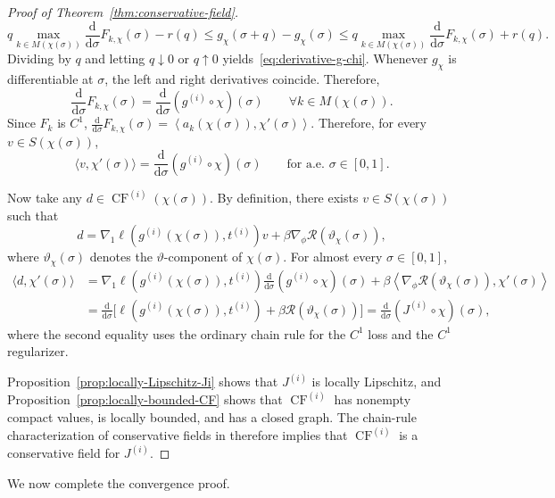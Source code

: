 \documentclass[11pt, letterpaper, oneside, reqno]{amsart}
\newcommand{\dd}{\mathrm{d}}
\begin{document}
\begin{proof}[Proof of Theorem~\ref{thm:conservative-field}]
\[
q\max_{k\in M(\chi(\sigma))}\frac{\dd}{\dd\sigma}F_{k,\chi}(\sigma)-r(q)
\le g_\chi(\sigma+q)-g_\chi(\sigma)
\le q\max_{k\in M(\chi(\sigma))}\frac{\dd}{\dd\sigma}F_{k,\chi}(\sigma)+r(q).
\]
Dividing by $q$ and letting $q\downarrow0$ or $q\uparrow0$ yields~\eqref{eq:derivative-g-chi}. Whenever $g_\chi$ is differentiable at $\sigma$, the left and right derivatives coincide. Therefore,
\[
\frac{\dd}{\dd\sigma}F_{k,\chi}(\sigma)
= \frac{\dd}{\dd\sigma}(g^{(i)}\circ\chi)(\sigma)
\qquad \forall k\in M(\chi(\sigma)).
\]
Since $F_k$ is $C^1$, $\frac{\dd}{\dd\sigma}F_{k,\chi}(\sigma) = \left\langle a_k(\chi(\sigma)),\chi'(\sigma)\right\rangle$.
Therefore, for every $v\in S(\chi(\sigma))$,
\[
\langle v,\chi'(\sigma)\rangle
= \frac{\dd}{\dd\sigma}(g^{(i)}\circ\chi)(\sigma) \qquad\text{for a.e. }\sigma\in[0,1].
\]

Now take any $d\in\operatorname{CF}^{(i)}(\chi(\sigma))$. By definition, there exists $v\in S(\chi(\sigma))$ such that
\[
d = \nabla_1\ell(g^{(i)}(\chi(\sigma)),t^{(i)})v + \beta\nabla_\phi\mathcal R(\vartheta_\chi(\sigma)),
\]
where $\vartheta_\chi(\sigma)$ denotes the $\vartheta$-component of $\chi(\sigma)$. For almost every $\sigma\in[0,1]$,
\begin{align*}
\langle d,\chi'(\sigma)\rangle
&= \nabla_1\ell(g^{(i)}(\chi(\sigma)),t^{(i)}) \frac{\dd}{\dd\sigma}(g^{(i)}\circ\chi)(\sigma)
+ \beta \left\langle \nabla_\phi\mathcal R(\vartheta_\chi(\sigma)),\chi'(\sigma) \right\rangle\\
&= \frac{\dd}{\dd\sigma} \bigl[ \ell(g^{(i)}(\chi(\sigma)),t^{(i)}) + \beta\mathcal R(\vartheta_\chi(\sigma)) \bigr]
= \frac{\dd}{\dd\sigma}(J^{(i)}\circ\chi)(\sigma),
\end{align*}
where the second equality uses the ordinary chain rule for the $C^1$ loss and the $C^1$ regularizer.

Proposition~\ref{prop:locally-Lipschitz-Ji} shows that $J^{(i)}$ is locally Lipschitz, and Proposition~\ref{prop:locally-bounded-CF} shows that $\operatorname{CF}^{(i)}$ has nonempty compact values, is locally bounded, and has a closed graph. The chain-rule characterization of conservative fields in \cite[Lemma~2]{ref:bolte2021conservative} therefore implies that $\operatorname{CF}^{(i)}$ is a conservative field for $J^{(i)}$.
\end{proof}

We now complete the convergence proof.
\end{document}
